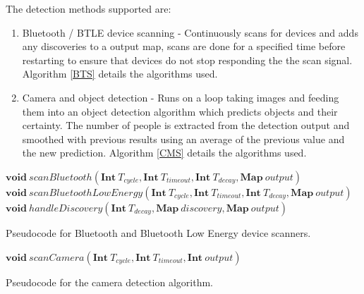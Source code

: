 \documentclass{l4proj}
\begin{document}
The detection methods supported are:
\begin{enumerate}
  \item Bluetooth / BTLE device scanning -  Continuously scans for devices and adds any discoveries to a output map, scans are done for a specified time before restarting to ensure that devices do not stop responding the the scan signal. Algorithm \ref{BTS} details the algorithms used.
  \item Camera and object detection -  Runs on a loop taking images and feeding them into an object detection algorithm which predicts objects and their certainty. The number of people is extracted from the detection output and smoothed with previous results using an average of the previous value and the new prediction. Algorithm \ref{CMS} details the algorithms used.
\end{enumerate}

\begin{algorithm}
\DontPrintSemicolon
\nl $\textbf{void}~scanBluetooth(\textbf{Int}~T_{cycle}, \textbf{Int}~T_{timeout}, \textbf{Int}~T_{decay}, \textbf{Map}~output)$ \;
\nl {}
\;
\nl $\textbf{void}~scanBluetoothLowEnergy(\textbf{Int}~T_{cycle}, \textbf{Int}~T_{timeout}, \textbf{Int}~T_{decay}, \textbf{Map}~output)$ \;
\nl {}
\;
\nl $\textbf{void}~handleDiscovery(\textbf{Int}~T_{decay}, \textbf{Map}~discovery, \textbf{Map}~output)$ \;
\nl {}
\;
\caption{Pseudocode for Bluetooth and Bluetooth Low Energy device scanners.}
\label{BTS}
\end{algorithm}

\begin{algorithm}
\DontPrintSemicolon
\nl $\textbf{void}~scanCamera(\textbf{Int}~T_{cycle}, \textbf{Int}~T_{timeout}, \textbf{Int}~output)$ \;
\nl {}
\;
\caption{Pseudocode for the camera detection algorithm.}
\label{CMS}
\end{algorithm}
\end{document}
